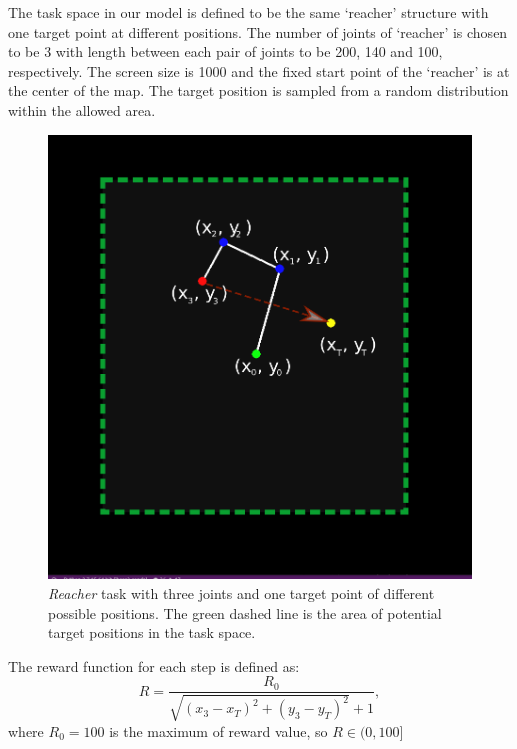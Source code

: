 \documentclass{article}
\begin{document}
The task space in our model is defined to be the same `reacher' structure with one target point at different positions. The number of joints of `reacher' is chosen to be 3 with length between each pair of joints to be 200, 140 and 100, respectively. The screen size is 1000 and the fixed start point of the `reacher' is at the center of the map. The target position is sampled from a random distribution within the allowed area.
\begin{figure}[htbp]
	\centering
	\includegraphics[scale=0.3]{img/reacher1.png}
	\caption{\textit{Reacher} task with three joints and one target point of different possible positions. The green dashed line is the area of potential target positions in the task space.}
	\label{fig:universe}
\end{figure}
The reward function for each step is defined as:
\begin{equation}
 R=\frac{R_0}{\sqrt{(x_3-x_T)^2+(y_3-y_T)^2}+1}, 
\end{equation}
where $R_0=100$ is the maximum of reward value, so $R\in(0,100]$
\end{document}
